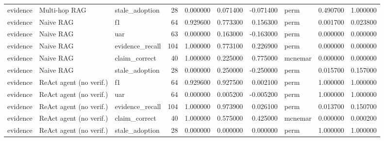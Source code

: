 \begin{table}
\begin{tabular}{lllrrrrlrr}
evidence & Multi-hop RAG & stale\_adoption & 28 & 0.000000 & 0.071400 & -0.071400 & perm & 0.490700 & 1.000000 \\
evidence & Naive RAG & f1 & 64 & 0.929600 & 0.773300 & 0.156300 & perm & 0.001700 & 0.023800 \\
evidence & Naive RAG & uar & 63 & 0.000000 & 0.163000 & -0.163000 & perm & 0.000000 & 0.000000 \\
evidence & Naive RAG & evidence\_recall & 104 & 1.000000 & 0.773100 & 0.226900 & perm & 0.000000 & 0.000000 \\
evidence & Naive RAG & claim\_correct & 40 & 1.000000 & 0.225000 & 0.775000 & mcnemar & 0.000000 & 0.000000 \\
evidence & Naive RAG & stale\_adoption & 28 & 0.000000 & 0.250000 & -0.250000 & perm & 0.015700 & 0.157000 \\
evidence & ReAct agent (no verif.) & f1 & 64 & 0.929600 & 0.927500 & 0.002100 & perm & 1.000000 & 1.000000 \\
evidence & ReAct agent (no verif.) & uar & 64 & 0.000000 & 0.005200 & -0.005200 & perm & 1.000000 & 1.000000 \\
evidence & ReAct agent (no verif.) & evidence\_recall & 104 & 1.000000 & 0.973900 & 0.026100 & perm & 0.013700 & 0.150700 \\
evidence & ReAct agent (no verif.) & claim\_correct & 40 & 1.000000 & 0.575000 & 0.425000 & mcnemar & 0.000000 & 0.000200 \\
evidence & ReAct agent (no verif.) & stale\_adoption & 28 & 0.000000 & 0.000000 & 0.000000 & perm & 1.000000 & 1.000000 \\
\bottomrule
\end{tabular}
\end{table}
